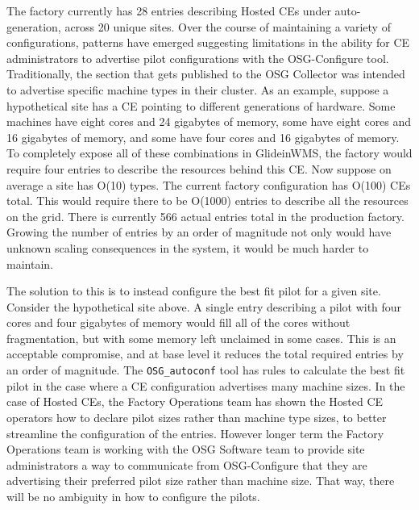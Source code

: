 \documentclass{webofc}
\begin{document}
The factory currently has 28 entries describing Hosted CEs under auto-generation, across 20 unique sites. Over the course of maintaining a variety of configurations, patterns have emerged suggesting limitations in the ability for CE administrators to advertise pilot configurations with the OSG-Configure tool. Traditionally, the section that gets published to the OSG Collector was intended to advertise specific machine types in their cluster. As an example, suppose a hypothetical site has a CE pointing to different generations of hardware. Some machines have eight cores and 24 gigabytes of memory, some have eight cores and 16 gigabytes of memory, and some have four cores and 16 gigabytes of memory. To completely expose all of these combinations in GlideinWMS, the factory would require four entries to describe the resources behind this CE. Now suppose on average a site has O(10) types. The current factory configuration has O(100) CEs total. This would require there to be O(1000) entries to describe all the resources on the grid. There is currently 566 actual entries total in the production factory. Growing the number of entries by an order of magnitude not only would have unknown scaling consequences in the system, it would be much harder to maintain.

The solution to this is to instead configure the best fit pilot for a given site. Consider the hypothetical site above. A single entry describing a pilot with four cores and four gigabytes of memory would fill all of the cores without fragmentation, but with some memory left unclaimed in some cases. This is an acceptable compromise, and at base level it reduces the total required entries by an order of magnitude. The \verb"OSG_autoconf" tool has rules to calculate the best fit pilot in the case where a CE configuration advertises many machine sizes. In the case of Hosted CEs, the Factory Operations team has shown the Hosted CE operators how to declare pilot sizes rather than machine type sizes, to better streamline the configuration of the entries. However longer term the Factory Operations team is working with the OSG Software team to provide site administrators a way to communicate from OSG-Configure that they are advertising their preferred pilot size rather than machine size. That way, there will be no ambiguity in how to configure the pilots.

\end{document}
